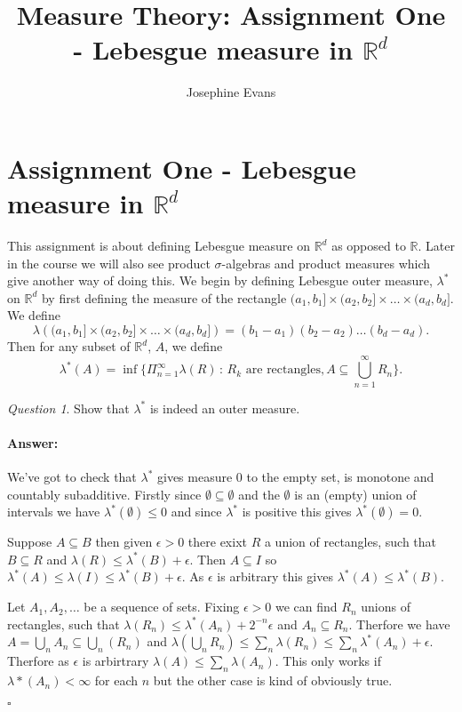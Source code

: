 \documentclass[11pt]{article}
\author{
Josephine Evans
}
\title{Measure Theory: Assignment One - Lebesgue measure in $\mathbb{R}^d$}
\theoremstyle{definition}
\theoremstyle{remark}
\newtheorem{q}[thm]{Question}
\newenvironment{ans}{\paragraph{Answer:}}{\hfill$\square$}
\begin{document}
	\section{Assignment One - Lebesgue measure in $\mathbb{R}^d$}
This assignment is about defining Lebesgue measure on $\mathbb{R}^d$ as opposed to $\mathbb{R}$. Later in the course we will also see product $\sigma$-algebras and product measures which give another way of doing this. We begin by defining Lebesgue outer measure, $\lambda^*$ on $\mathbb{R}^d$ by first defining the measure of the rectangle $(a_1,b_1] \times (a_2, b_2] \times \dots \times (a_d, b_d]$. We define
\[ \lambda \left( (a_1,b_1] \times (a_2, b_2] \times \dots \times (a_d, b_d]\right)  = (b_1-a_1)(b_2-a_2)\dots(b_d-a_d).\] Then for any subset of $\mathbb{R}^d$, $A$, we define
\[ \lambda^*(A) = \inf\{ \Pi_{n=1}^\infty \lambda(R) \,:\, \mbox{$R_k$ are rectangles}, A \subseteq \bigcup_{n=1}^\infty R_n \}.  \]
\begin{q}
Show that $\lambda^*$ is indeed an outer measure.
\end{q}
\begin{ans}
We've got to check that $\lambda^*$ gives measure 0 to the empty set, is monotone and countably subadditive. Firstly since $\emptyset \subseteq \emptyset$ and the $\emptyset$ is an (empty) union of intervals we have $\lambda^*(\emptyset) \leq 0$ and since $\lambda^*$ is positive this gives $\lambda^*(\emptyset) = 0$.

Suppose $A \subseteq B$ then given $\epsilon >0$ there exixt $R$ a union of rectangles, such that $B \subseteq R$ and $\lambda(R) \leq \lambda^*(B) + \epsilon$. Then $A \subseteq I$ so $\lambda^*(A) \leq \lambda(I) \leq \lambda^*(B)+ \epsilon$. As $\epsilon$ is arbitrary this gives $\lambda^*(A) \leq \lambda^*(B)$.

Let $A_1, A_2, \dots$ be a sequence of sets. Fixing $\epsilon>0$ we can find $R_n$ unions of rectangles, such that $\lambda(R_n) \leq \lambda^*(A_n) + 2^{-n}\epsilon$ and $A_n \subseteq R_n$. Therfore we have $A= \bigcup_n A_n \subseteq \bigcup_n(R_n)$ and $\lambda(\bigcup_n R_n) \leq \sum_n \lambda(R_n) \leq \sum_n \lambda^*(A_n) + \epsilon$. Therfore as $\epsilon$ is arbirtrary $\lambda(A) \leq \sum_n \lambda(A_n)$. This only works if $\lambda*(A_n)<\infty$ for each $n$ but the other case is kind of obviously true.

\end{ans}
\end{document}
